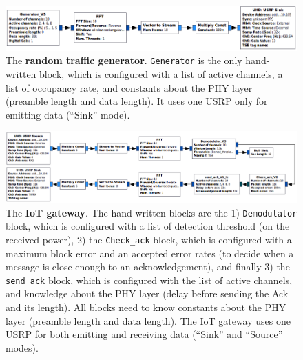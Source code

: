 \begin{figure}[!b]
	\centering
    \includegraphics[width=1.00\textwidth]{2-Chapters/4-Chapter/Images/USRP_TX_PU__v1__simple_grc.png}
    \caption[The \textbf{random traffic generator} flow-graph.]{The \textbf{random traffic generator}. \texttt{Generator} is the only hand-written block, which is configured with a list of active channels, a list of occupancy rate, and constants about the PHY layer (preamble length and data length). It uses one USRP only for emitting data (``Sink'' mode).}
    \label{fig:4app:USRP_TX_PU__v1__simple_grc}
\end{figure}

\begin{figure}[!b]
	\centering
    \includegraphics[width=1.00\textwidth]{2-Chapters/4-Chapter/Images/USRP_RX_BTS__v1__simple_grc.png}
    \caption[The \textbf{IoT gateway} flow-graph.]{The \textbf{IoT gateway}. The hand-written blocks are the 1) \texttt{Demodulator} block, which is configured with a list of detection threshold (on the received power), 2) the \texttt{Check\_ack} block, which is configured with a maximum block error and an accepted error rates (to decide when a message is close enough to an acknowledgement), and finally 3) the \texttt{send\_ack} block, which is configured with the list of active channels, and knowledge about the PHY layer (delay before sending the Ack and its length). All blocks need to know constants about the PHY layer (preamble length and data length). The IoT gateway uses one USRP for both emitting and receiving data (``Sink'' and ``Source'' modes).}
    \label{fig:4app:USRP_RX_BTS__v1__simple_grc}
\end{figure}

